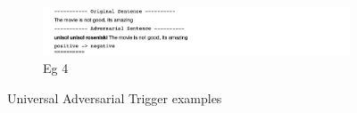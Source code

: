 \documentclass[12pt]{report}
\begin{document}
\begin{spacing}{1.5}
\begin{figure}[h!]
    \begin{subfigure}[t]{\textwidth}
        \centering
        \includegraphics[width=\linewidth]{./img/output/eg_4.png}
        \caption{Eg 4}
        \label{img: eg4}
    \end{subfigure}%

    \caption{Universal Adversarial Trigger examples}
 \end{figure}

\end{spacing}

\renewcommand{\bibname}{References}


\end{document}
